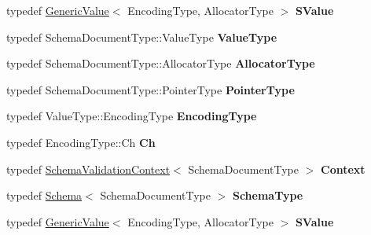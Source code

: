 \begin{DoxyCompactItemize}
\item 
typedef \hyperlink{class_generic_value}{Generic\+Value}$<$ Encoding\+Type, Allocator\+Type $>$ {\bfseries S\+Value}\hypertarget{classinternal_1_1_schema_ab3a07540a27d4cc2b0e260290c5c5771}{}\label{classinternal_1_1_schema_ab3a07540a27d4cc2b0e260290c5c5771}

\item 
typedef Schema\+Document\+Type\+::\+Value\+Type {\bfseries Value\+Type}\hypertarget{classinternal_1_1_schema_a8976b6d7e2a885483d0b51d941019340}{}\label{classinternal_1_1_schema_a8976b6d7e2a885483d0b51d941019340}

\item 
typedef Schema\+Document\+Type\+::\+Allocator\+Type {\bfseries Allocator\+Type}\hypertarget{classinternal_1_1_schema_a7af392edd81e610754cd2e6b4f82761c}{}\label{classinternal_1_1_schema_a7af392edd81e610754cd2e6b4f82761c}

\item 
typedef Schema\+Document\+Type\+::\+Pointer\+Type {\bfseries Pointer\+Type}\hypertarget{classinternal_1_1_schema_a13d7dbba6e4a77b10862546777c5aae8}{}\label{classinternal_1_1_schema_a13d7dbba6e4a77b10862546777c5aae8}

\item 
typedef Value\+Type\+::\+Encoding\+Type {\bfseries Encoding\+Type}\hypertarget{classinternal_1_1_schema_a9ea269c3ca8099c2a14b6519fe34efb1}{}\label{classinternal_1_1_schema_a9ea269c3ca8099c2a14b6519fe34efb1}

\item 
typedef Encoding\+Type\+::\+Ch {\bfseries Ch}\hypertarget{classinternal_1_1_schema_a98043fca39adbf8b42e7472e3d80d6fa}{}\label{classinternal_1_1_schema_a98043fca39adbf8b42e7472e3d80d6fa}

\item 
typedef \hyperlink{structinternal_1_1_schema_validation_context}{Schema\+Validation\+Context}$<$ Schema\+Document\+Type $>$ {\bfseries Context}\hypertarget{classinternal_1_1_schema_ac3f54abfefe300c5610c1205869cfd66}{}\label{classinternal_1_1_schema_ac3f54abfefe300c5610c1205869cfd66}

\item 
typedef \hyperlink{classinternal_1_1_schema}{Schema}$<$ Schema\+Document\+Type $>$ {\bfseries Schema\+Type}\hypertarget{classinternal_1_1_schema_ac2556ebf7a7db971e1c1c0f76eb5786e}{}\label{classinternal_1_1_schema_ac2556ebf7a7db971e1c1c0f76eb5786e}

\item 
typedef \hyperlink{class_generic_value}{Generic\+Value}$<$ Encoding\+Type, Allocator\+Type $>$ {\bfseries S\+Value}\hypertarget{classinternal_1_1_schema_ab3a07540a27d4cc2b0e260290c5c5771}{}\label{classinternal_1_1_schema_ab3a07540a27d4cc2b0e260290c5c5771}

\end{DoxyCompactItemize}
